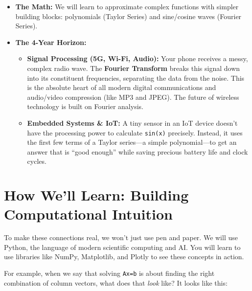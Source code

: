 \documentclass[
  letterpaper,
  DIV=11,
  numbers=noendperiod]{scrreprt}
\providecommand{\tightlist}{%
  \setlength{\itemsep}{0pt}\setlength{\parskip}{0pt}}
\begin{document}
\begin{itemize}
\tightlist
\item
  \textbf{The Math:} We will learn to approximate complex functions with
  simpler building blocks: polynomials (Taylor Series) and sine/cosine
  waves (Fourier Series).
\item
  \textbf{The 4-Year Horizon:}

  \begin{itemize}
  \tightlist
  \item
    \textbf{Signal Processing (5G, Wi-Fi, Audio):} Your phone receives a
    messy, complex radio wave. The \textbf{Fourier Transform} breaks
    this signal down into its constituent frequencies, separating the
    data from the noise. This is the absolute heart of all modern
    digital communications and audio/video compression (like MP3 and
    JPEG). The future of wireless technology is built on Fourier
    analysis.
  \item
    \textbf{Embedded Systems \& IoT:} A tiny sensor in an IoT device
    doesn't have the processing power to calculate \texttt{sin(x)}
    precisely. Instead, it uses the first few terms of a Taylor
    series---a simple polynomial---to get an answer that is ``good
    enough'' while saving precious battery life and clock cycles.
  \end{itemize}
\end{itemize}

\section{How We'll Learn: Building Computational
Intuition}\label{how-well-learn-building-computational-intuition}

To make these connections real, we won't just use pen and paper. We will
use Python, the language of modern scientific computing and AI. You will
learn to use libraries like NumPy, Matplotlib, and Plotly to see these
concepts in action.

For example, when we say that solving \texttt{Ax=b} is about finding the
right combination of column vectors, what does that \emph{look} like? It
looks like this:
\end{document}
